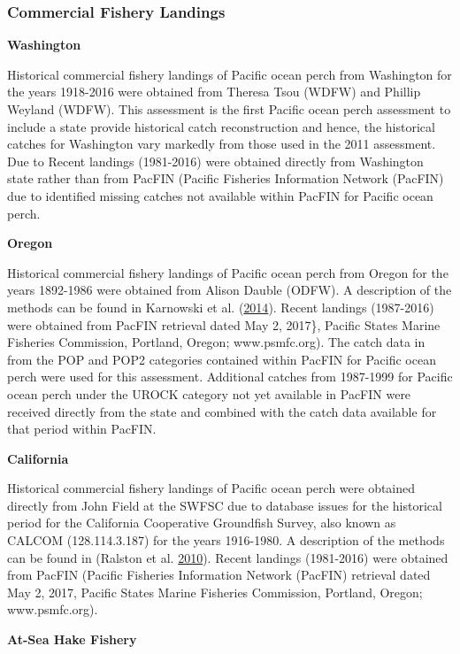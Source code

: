 \documentclass[12pt,]{article}
\begin{document}
\subsubsection{Commercial Fishery
Landings}\label{commercial-fishery-landings}

\textbf{Washington}

Historical commercial fishery landings of Pacific ocean perch from
Washington for the years 1918-2016 were obtained from Theresa Tsou
(WDFW) and Phillip Weyland (WDFW). This assessment is the first Pacific
ocean perch assessment to include a state provide historical catch
reconstruction and hence, the historical catches for Washington vary
markedly from those used in the 2011 assessment. Due to Recent landings
(1981-2016) were obtained directly from Washington state rather than
from PacFIN (Pacific Fisheries Information Network (PacFIN) due to
identified missing catches not available within PacFIN for Pacific ocean
perch.

\textbf{Oregon}

Historical commercial fishery landings of Pacific ocean perch from
Oregon for the years 1892-1986 were obtained from Alison Dauble (ODFW).
A description of the methods can be found in Karnowski et al.
(\protect\hyperlink{ref-karnowski_historical_2014}{2014}). Recent
landings (1987-2016) were obtained from PacFIN retrieval dated May 2,
2017\}, Pacific States Marine Fisheries Commission, Portland, Oregon;
www.psmfc.org). The catch data in from the POP and POP2 categories
contained within PacFIN for Pacific ocean perch were used for this
assessment. Additional catches from 1987-1999 for Pacific ocean perch
under the UROCK category not yet available in PacFIN were received
directly from the state and combined with the catch data available for
that period within PacFIN.

\textbf{California}

Historical commercial fishery landings of Pacific ocean perch were
obtained directly from John Field at the SWFSC due to database issues
for the historical period for the California Cooperative Groundfish
Survey, also known as CALCOM (128.114.3.187) for the years 1916-1980. A
description of the methods can be found in (Ralston et al.
\protect\hyperlink{ref-ralston_documentation_2010}{2010}). Recent
landings (1981-2016) were obtained from PacFIN (Pacific Fisheries
Information Network (PacFIN) retrieval dated May 2, 2017, Pacific States
Marine Fisheries Commission, Portland, Oregon; www.psmfc.org).

\textbf{At-Sea Hake Fishery}
\end{document}
